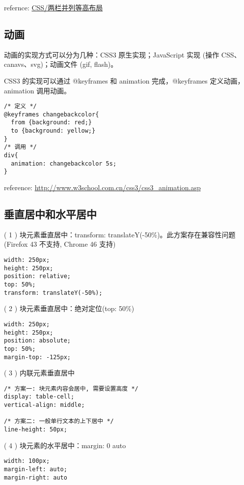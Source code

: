 refernce: \href{http://segmentfault.com/a/1190000000625584}{CSS/两栏并列等高布局}

\subsection{动画}\hypertarget{section-5}{}\label{section-5}

动画的实现方式可以分为几种：CSS3 原生实现；JavaScript 实现 (操作 CSS、canavs、svg)；动画文件 (gif, flash)。

CSS3 的实现可以通过 @keyframes 和 animation 完成，@keyframes 定义动画，animation 调用动画。

\begin{verbatim}/* 定义 */
@keyframes changebackcolor{
  from {background: red;}
  to {background: yellow;}
}
/* 调用 */
div{
  animation: changebackcolor 5s;
}
\end{verbatim}

reference: \href{http://www.w3school.com.cn/css3/css3\_animation.asp}{http://www.w3school.com.cn/css3/css3\_animation.asp}

\subsection{垂直居中和水平居中}\hypertarget{section-6}{}\label{section-6}

( 1 ) 块元素垂直居中：transform: translateY(-50\%)。此方案存在兼容性问题(Firefox 43 不支持, Chrome 46 支持)

\begin{verbatim}width: 250px;
height: 250px;
position: relative;
top: 50%;
transform: translateY(-50%);
\end{verbatim}

( 2 ) 块元素垂直居中：绝对定位(top: 50\%)

\begin{verbatim}width: 250px;
height: 250px;
position: absolute;
top: 50%;
margin-top: -125px;
\end{verbatim}

( 3 ) 内联元素垂直居中

\begin{verbatim}/* 方案一: 块元素内容会居中, 需要设置高度 */
display: table-cell;
vertical-align: middle;

/* 方案二: 一般单行文本的上下居中 */
line-height: 50px;
\end{verbatim}

( 4 ) 块元素的水平居中：margin: 0 auto

\begin{verbatim}width: 100px;
margin-left: auto;
margin-right: auto
\end{verbatim}
